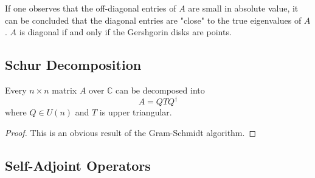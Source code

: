  If one observes that the off-diagonal entries of $A$ are small in absolute value, it can be concluded that the diagonal entries are "close" to the true eigenvalues of $A$. $A$ is diagonal if and only if the Gershgorin disks are points. 

\subsection{Schur Decomposition}

  \begin{theorem}
    \label{thm:schur-decomposition}
    Every $n \times n$ matrix $A$ over $\mathbb{C}$ can be decomposed into
    \begin{equation}
      A = Q T Q^\dagger
    \end{equation}
    where $Q \in U(n)$ and $T$ is upper triangular. 
  \end{theorem}
  \begin{proof}
    This is an obvious result of the Gram-Schmidt algorithm. 
  \end{proof}

\subsection{Self-Adjoint Operators}

